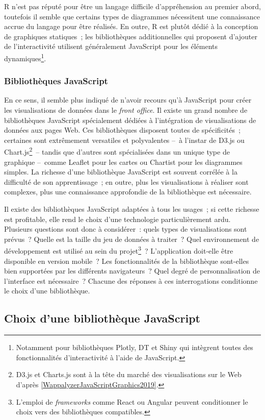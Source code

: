 \documentclass[a4paper,12pt,twoside]{book}
\newcommand{\eng}{\emph}
\newcommand{\fo}{\eng{front office}\xspace}
\begin{document}
R n'est pas réputé pour être un langage difficile d'appréhension au premier abord, toutefois il semble que certains types de diagrammes nécessitent une connaissance accrue du langage pour être réalisés. En outre, R est plutôt dédié à la conception de graphiques statiques~; les bibliothèques additionnelles qui proposent d'ajouter de l'interactivité utilisent généralement JavaScript pour les éléments dynamiques\footnote{Notamment pour bibliothèques Plotly, DT et Shiny qui intègrent toutes des fonctionnalités d'interactivité à l'aide de JavaScript.}.

			\subsubsection{Bibliothèques JavaScript}
En ce sens, il semble plus indiqué de n'avoir recours qu'à JavaScript pour créer les visualisations de données dans le \fo. Il existe un grand nombre de bibliothèques JavaScript spécialement dédiées à l'intégration de visualisations de données aux pages Web. Ces bibliothèques disposent toutes de spécificités~; certaines sont extrêmement versatiles et polyvalentes –~à l'instar de D3.js ou Chart.js\footnote{D3.js et Charts.js sont à la tête du marché des visualisations sur le Web d'après \ref{WappalyzerJavaScriptGraphics2019}.}~– tandis que d'autres sont spécialisées dans un unique type de graphique –~comme Leaflet pour les cartes ou Chartist pour les diagrammes simples. La richesse d'une bibliothèque JavaScript est souvent corrélée à la difficulté de son apprentissage~; en outre, plus les visualisations à réaliser sont complexes, plus une connaissance approfondie de la bibliothèque est nécessaire.

Il existe des bibliothèques JavaScript adaptées à tous les usages~; si cette richesse est profitable, elle rend le choix d'une technologie particulièrement ardu. Plusieurs questions sont donc à considérer~: quels types de visualisations sont prévus~? Quelle est la taille du jeu de données à traiter~? Quel environnement de développement est utilisé au sein du projet\footnote{L'emploi de \eng{frameworks} comme React ou Angular peuvent conditionner le choix vers des bibliothèques compatibles.}~? L'application doit-elle être disponible en version mobile~? Les fonctionnalités de la bibliothèque sont-elles bien supportées par les différents navigateurs~? Quel degré de personnalisation de l'interface est nécessaire~? Chacune des réponses à ces interrogations conditionne le choix d'une bibliothèque.

		\subsection{Choix d'une bibliothèque JavaScript}
\end{document}
